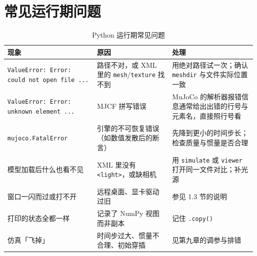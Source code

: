 \section{常见运行期问题}

\begin{table}[H]
	\centering
	\caption{Python 运行期常见问题}
	\label{tab:Python:运行报错}
	\footnotesize
	\begin{tabular}{>{\raggedright\arraybackslash}p{4.6cm}>{\raggedright\arraybackslash}p{4.4cm}>{\raggedright\arraybackslash}p{5.4cm}}
		\hline
		现象 & 原因 & 处理 \\
		\hline
		\texttt{ValueError: Error: could not open file ...} & 路径不对，或 XML 里的 \texttt{mesh}/\texttt{texture} 找不到 & 用绝对路径试一次；确认 \texttt{meshdir} 与文件实际位置一致 \\
		\texttt{ValueError: Error: unknown element ...} & MJCF 拼写错误 & MuJoCo 的解析器报错信息通常给出出错的行号与元素名，直接照行号看 \\
		\texttt{mujoco.FatalError} & 引擎的不可恢复错误（如数值发散后的断言） & 先降到更小的时间步长；检查质量与惯量是否合理 \\
		模型加载后什么也看不见 & XML 里没有 \texttt{<light>}，或缺相机 & 用 \texttt{simulate} 或 \texttt{viewer} 打开同一文件对比；补光源 \\
		窗口一闪而过或打不开 & 远程桌面、显卡驱动过旧 & 参见 1.3 节的说明 \\
		打印的状态全都一样 & 记录了 NumPy 视图而非副本 & 记住 \texttt{.copy()} \\
		仿真「飞掉」 & 时间步过大、惯量不合理、初始穿插 & 见第九章的调参与排错 \\
		\hline
	\end{tabular}
\end{table}
